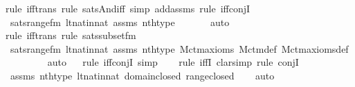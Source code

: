\begin{isabellebody}
{\isacharparenleft}{\kern0pt}rule\ iff{\isacharunderscore}{\kern0pt}trans{\isacharcomma}{\kern0pt}\ rule\ sats{\isacharunderscore}{\kern0pt}And{\isacharunderscore}{\kern0pt}iff{\isacharcomma}{\kern0pt}\ simp\ add{\isacharcolon}{\kern0pt}assms{\isacharcomma}{\kern0pt}\ rule\ iff{\isacharunderscore}{\kern0pt}conjI{}{\isacharparenright}{\kern0pt}\isanewline
\ \ \isamarkupfalse%
\ sats{\isacharunderscore}{\kern0pt}range{\isacharunderscore}{\kern0pt}fm\ lt{\isacharunderscore}{\kern0pt}nat{\isacharunderscore}{\kern0pt}in{\isacharunderscore}{\kern0pt}nat\ assms\ nth{\isacharunderscore}{\kern0pt}type\ \isanewline
\ \ \ \ \isamarkupfalse%
\ auto{\isacharbrackleft}{\kern0pt}{}{\isacharbrackright}{\kern0pt}\isanewline
\ \ \isamarkupfalse%
{\isacharparenleft}{\kern0pt}rule\ iff{\isacharunderscore}{\kern0pt}trans{\isacharcomma}{\kern0pt}\ rule\ sats{\isacharunderscore}{\kern0pt}subset{\isacharunderscore}{\kern0pt}fm{\isacharparenright}{\kern0pt}\isanewline
\ \ \isamarkupfalse%
\ sats{\isacharunderscore}{\kern0pt}range{\isacharunderscore}{\kern0pt}fm\ lt{\isacharunderscore}{\kern0pt}nat{\isacharunderscore}{\kern0pt}in{\isacharunderscore}{\kern0pt}nat\ assms\ nth{\isacharunderscore}{\kern0pt}type\ M{\isacharunderscore}{\kern0pt}ctm{\isacharunderscore}{\kern0pt}axioms\ M{\isacharunderscore}{\kern0pt}ctm{\isacharunderscore}{\kern0pt}def\ M{\isacharunderscore}{\kern0pt}ctm{\isacharunderscore}{\kern0pt}axioms{\isacharunderscore}{\kern0pt}def\isanewline
\ \ \ \ \ \ \ \isamarkupfalse%
\ auto{\isacharbrackleft}{\kern0pt}{}{\isacharbrackright}{\kern0pt}\isanewline
\ \ \isamarkupfalse%
{\isacharparenleft}{\kern0pt}rule\ iff{\isacharunderscore}{\kern0pt}conjI{}{\isacharcomma}{\kern0pt}\ simp{\isacharparenright}{\kern0pt}\isanewline
\ \ \isamarkupfalse%
\ {\isacharparenleft}{\kern0pt}rule\ iffI{\isacharcomma}{\kern0pt}\ clarsimp{\isacharcomma}{\kern0pt}\ rule\ conjI{\isacharparenright}{\kern0pt}\isanewline
\ \ \isamarkupfalse%
\ assms\ nth{\isacharunderscore}{\kern0pt}type\ lt{\isacharunderscore}{\kern0pt}nat{\isacharunderscore}{\kern0pt}in{\isacharunderscore}{\kern0pt}nat\ domain{\isacharunderscore}{\kern0pt}closed\ range{\isacharunderscore}{\kern0pt}closed\isanewline
\ \ \isamarkupfalse%
\ auto%
\endisatagproof
{\isafoldproof}%
%
\isadelimproof
\isanewline
%
\endisadelimproof
\isanewline
{}\isamarkupfalse%

\end{isabellebody}
